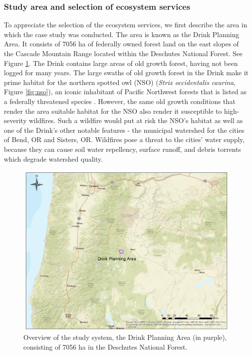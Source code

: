 \subsubsection{Study area and selection of ecosystem services}
\label{subsec:studyArea}
To appreciate the selection of the ecosystem services, we first describe the area in which the case study was conducted. The area is known as the Drink Planning Area. It consists of 7056 ha of federally owned forest land on the east slopes of the Cascade Mountain Range located within the Deschutes National Forest. See Figure \ref{fig:drinkOverview}. The Drink contains large areas of old growth forest, having not been logged for many years. The large swaths of old growth forest in the Drink make it prime habitat for the northern spotted owl (NSO) (\textit{Strix occidentalis caurina}, Figure \ref{fig:nso}), an iconic %
inhabitant of Pacific Northwest forests that is listed as a federally threatened species \cite{congress1973endangered}. However, the same old growth conditions that render the area suitable habitat for the NSO also render it susceptible to high-severity wildfires. Such a wildfire would put at risk the NSO's habitat \cite{courtney2004scientific} as well as one of the Drink's other notable features - the municipal watershed for the cities of Bend, OR and Sisters, OR. Wildfires pose a threat to the cities' water supply, because they can cause soil water repellency, surface runoff, and debris torrents \cite{ice2004effects} which degrade watershed quality.

\begin{figure}[ht]
\centering
\includegraphics[width=.85\textwidth]{../images/DrinkMap_Overview}
\caption[Overview of the study system, the Drink Planning Area]{Overview of the study system, the Drink Planning Area (in purple), consisting of 7056 ha in the Deschutes National Forest.}
\label{fig:drinkOverview}
\end{figure}

